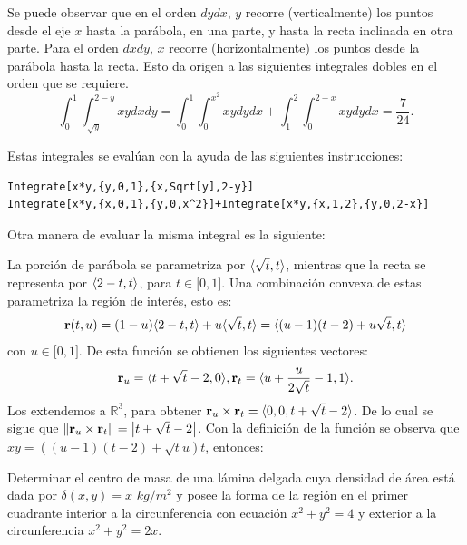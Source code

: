 Se puede observar que en el orden $dydx$, $y$ recorre (verticalmente) los puntos desde el eje $x$ hasta la parábola, en una parte, y hasta la recta inclinada en otra parte. Para el orden $dxdy$, $x$ recorre (horizontalmente) los puntos desde la parábola hasta la recta. Esto da origen a las siguientes integrales dobles en el orden que se requiere.
\[ \int_{0}^{1}\int_{\sqrt{y}}^{2-y}xydxdy =
\int_{0}^{1}\int_{0}^{x^{2}}xydydx+\int_{1}^{2}\int_{0}^{2-x}xydydx= \frac{7}{24}.\]

Estas integrales se evalúan con la ayuda de las siguientes instrucciones:

\begin{tcolorbox}[title=\bf Instrucción \verb"Mathematica"]\begin{Verbatim}[formatcom=\letraverbatim]
Integrate[x*y,{y,0,1},{x,Sqrt[y],2-y}]
Integrate[x*y,{x,0,1},{y,0,x^2}]+Integrate[x*y,{x,1,2},{y,0,2-x}]
\end{Verbatim}
\end{tcolorbox}

\clearpage

Otra manera de evaluar la misma integral es la siguiente:

\begin{tcolorbox}[title=\bf Parametrizando la región de integración]
La porción de parábola se parametriza por $\langle \sqrt{t},t\rangle$, mientras que la recta se representa por $\langle 2-t,t\rangle $, para $t\in \lbrack 0,1]$.
Una combinación convexa de estas parametriza la región de interés, esto es:
\begin{gather*}
  {\bf r}(t,u)=(1-u)\langle 2-t,t\rangle +u\langle \sqrt{t},t\rangle = \langle (u-1)(t-2)+u\sqrt{t},t\rangle
\end{gather*}
con $u\in \lbrack 0,1]$. De esta función se obtienen los siguientes vectores:
\[{\bf r}_{u} =\langle t+\sqrt{t}-2,0\rangle,{\bf r}_{t} =\langle u+\frac{u}{2\sqrt{t}}-1,1\rangle.\]
Los extendemos a $\mathbb{R}^{3}$, para obtener
${\bf r}_{u}\times {\bf r}_{t}= \langle 0,0,t+\sqrt{t}-2\rangle$.
De lo cual se sigue que $\left\Vert{\bf r}_{u}\times{\bf r}_{t}\right\Vert=\left\vert t+\sqrt{t}-2\right\vert$.
Con la definición de la función se observa que $xy=(\left(u-1\right) \left( t-2\right) +\sqrt{t}u) t$, entonces:

\end{tcolorbox}

\begin{parrafonumerado}[resume=ordenint]
\item Determinar el centro de masa de una lámina delgada cuya densidad de área está dada por $\delta (x,y)=x$ $kg/m^2$ y posee la forma de la región en el primer cuadrante interior a la circunferencia con ecuación $x^{2}+y^{2}=4$ y exterior a la circunferencia $x^{2}+y^{2}=2x$.
\end{parrafonumerado}

